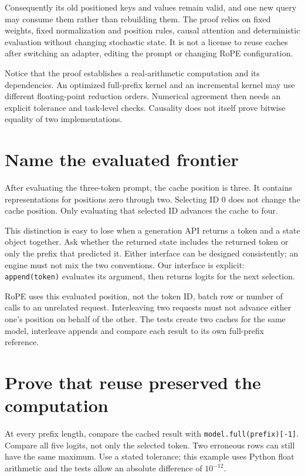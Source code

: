Consequently its old positioned keys and values remain valid, and one
new query may consume them rather than rebuilding them. The proof relies
on fixed weights, fixed normalization and position rules, causal
attention and deterministic evaluation without changing stochastic state.
It is not a license to reuse caches after switching an adapter, editing
the prompt or changing RoPE configuration.

Notice that the proof establishes a real-arithmetic computation and its
dependencies. An optimized full-prefix kernel and an incremental kernel
may use different floating-point reduction orders. Numerical agreement
then needs an explicit tolerance and task-level checks. Causality does
not itself prove bitwise equality of two implementations.

\section{Name the evaluated frontier}
After evaluating the three-token prompt, the cache position is three.
It contains representations for positions zero through two. Selecting
ID 0 does not change the cache position. Only evaluating that selected
ID advances the cache to four.

This distinction is easy to lose when a generation API returns a token
and a state object together. Ask whether the returned state includes
the returned token or only the prefix that predicted it. Either interface
can be designed consistently; an engine must not mix the two conventions.
Our interface is explicit: \texttt{append(token)} evaluates its argument,
then returns logits for the next selection.

RoPE uses this evaluated position, not the token ID, batch row or
number of calls to an unrelated request. Interleaving two requests must
not advance either one's position on behalf of the other. The tests
create two caches for the same model, interleave appends and compare
each result to its own full-prefix reference.

\section{Prove that reuse preserved the computation}
At every prefix length, compare the cached result with
\texttt{model.full(prefix)[-1]}. Compare all five logits, not only the
selected token. Two erroneous rows can still have the same maximum.
Use a stated tolerance; this example uses Python float arithmetic and
the tests allow an absolute difference of $10^{-12}$.

